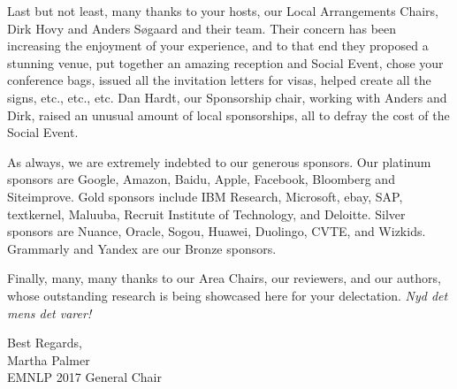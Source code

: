 Last but not least, many thanks to your hosts, our Local Arrangements Chairs, Dirk Hovy and Anders Søgaard and their team.  Their concern has been increasing the enjoyment of your experience, and to that end they proposed a stunning venue, put together an amazing reception and Social Event, chose your conference bags, issued all the invitation letters for visas, helped create all the signs, etc., etc., etc.  Dan Hardt, our Sponsorship chair, working with Anders and Dirk, raised an unusual amount of local sponsorships, all to defray the cost of the Social Event.

As always, we are extremely indebted to our generous sponsors. Our platinum sponsors are Google, Amazon, Baidu, Apple, Facebook, Bloomberg and Siteimprove.  Gold sponsors include IBM Research, Microsoft, ebay, SAP, textkernel, Maluuba, Recruit Institute of Technology, and Deloitte.  Silver sponsors are Nuance, Oracle, Sogou, Huawei, Duolingo, CVTE, and Wizkids. Grammarly and Yandex are our Bronze sponsors.

Finally, many, many thanks to our Area Chairs, our reviewers, and our authors, whose outstanding research is being showcased here for your delectation. \textit{Nyd det mens det varer!}

\vspace{3em}
\noindent
Best Regards,\\
Martha Palmer\\
EMNLP 2017 General Chair



